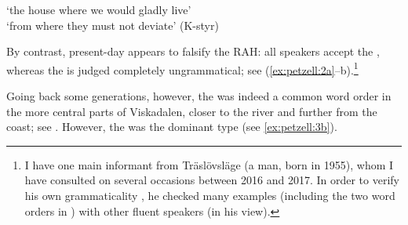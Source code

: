 \documentclass[output=paper,colorlinks,citecolor=brown,draft,draftmode]{langscibook}
\begin{document}
\ea\label{ex:petzell:1}
\glt `the house where we would gladly live’  \\
\glt `from where they must not deviate’ (K-styr)
\z
\z


By contrast, present-day  appears to falsify the RAH: all speakers accept the , whereas the  is judged completely ungrammatical; see (\ref{ex:petzell:2a}–b).\footnote{I have one main informant from Träslövsläge (a man, born in 1955), whom I have consulted on several occasions between 2016 and 2017. In order to verify his own grammaticality , he checked many examples (including the two word orders in ) with other fluent  speakers (in his view).}


\ea\label{ex:petzell:2}
\z
\z

Going back some generations, however, the  was indeed a common  word order in the more central parts of Viskadalen, closer to the river and further from the coast; see . However, the  was the dominant type (see \ref{ex:petzell:3b}).
\end{document}
